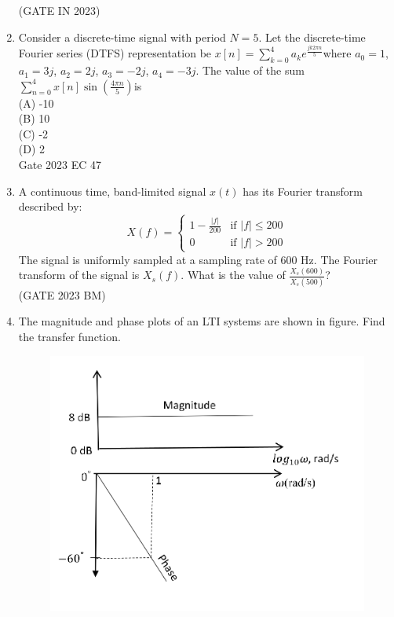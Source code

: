 \begin{enumerate}[label=\thechapter.\arabic*,ref=\thechapter.\theenumi]
\hfill{(GATE IN 2023)}\\
\solution
\pagebreak
\item Consider a discrete-time signal with period $N=5$. Let the discrete-time Fourier series (DTFS) representation be $ x[n] = \sum\limits_{k=0}^{4} a_k e^{\frac{jk2\pi n}{5}} $where $a_0=1$, $a_1=3j$, $a_2=2j$, $a_3=-2j$, $a_4=-3j$. The value of the sum $\sum\limits_{n=0}^{4}x[n] \sin\left(\frac{4\pi n}{5}\right) $is\\
(A) -10\\
(B) 10\\
(C) -2\\
(D) 2\\
\hfill Gate 2023 EC 47
\solution
\pagebreak
\item A continuous time, band-limited signal $x(t)$ has its Fourier transform described by:
\[ X(f) = \begin{cases} 
1 - \frac{|f|}{200} & \text{if } |f| \leq 200 \\
0 & \text{if } |f| > 200 
\end{cases} \]
The signal is uniformly sampled at a sampling rate of 600 Hz. The Fourier transform of the signal is $X_s(f)$. What is the value of $\frac{X_s(600)}{X_s(500)}$? \\\hfill{(GATE 2023 BM)}
\solution
\pagebreak
 \item The magnitude and phase plots of an LTI systems are shown in figure. Find the transfer function.
\begin{figure}[!h]
    \centering
    \includegraphics[width=\columnwidth]{2023/EE/36/figs/gate.png}

\end{figure}
\end{enumerate}
